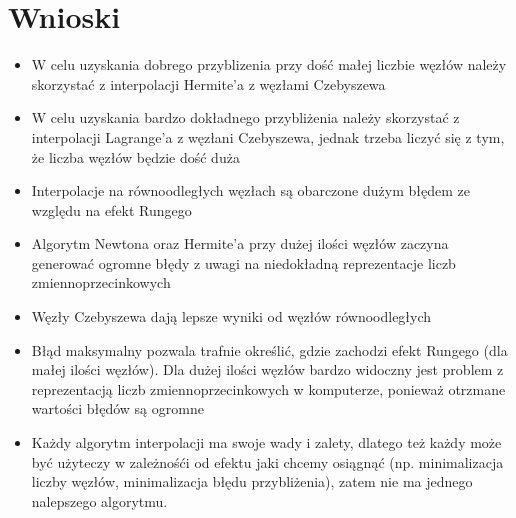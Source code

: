 \documentclass{article}
\begin{document}
\section{Wnioski}

\begin{itemize}
\item W celu uzyskania dobrego przyblizenia przy dość małej liczbie węzłów należy skorzystać z interpolacji Hermite'a z węzłami Czebyszewa
\item W celu uzyskania bardzo dokładnego przybliżenia należy skorzystać z interpolacji Lagrange'a z węzłani Czebyszewa, jednak trzeba liczyć się z tym, że liczba węzłów będzie dość duża
\item Interpolacje na równoodległych węzłach są obarczone dużym błędem ze względu na efekt Rungego
\item Algorytm Newtona oraz Hermite'a przy dużej ilości węzłów zaczyna generować ogromne błędy z uwagi na niedokładną reprezentacje liczb zmiennoprzecinkowych
\item Węzły Czebyszewa dają lepsze wyniki od węzłów równoodległych
\item Błąd maksymalny pozwala trafnie określić, gdzie zachodzi efekt Rungego (dla małej ilości węzłów). Dla dużej ilości węzłów bardzo widoczny jest problem z reprezentacją liczb zmiennoprzecinkowych w komputerze, ponieważ otrzmane wartości błędów są ogromne
\item Każdy algorytm interpolacji ma swoje wady i zalety, dlatego też każdy może być użyteczy w zależnośći od efektu jaki chcemy osiągnąć (np. minimalizacja liczby węzłów, minimalizacja błędu przybliżenia), zatem nie ma jednego nalepszego algorytmu.
\end{itemize}
\end{document}

